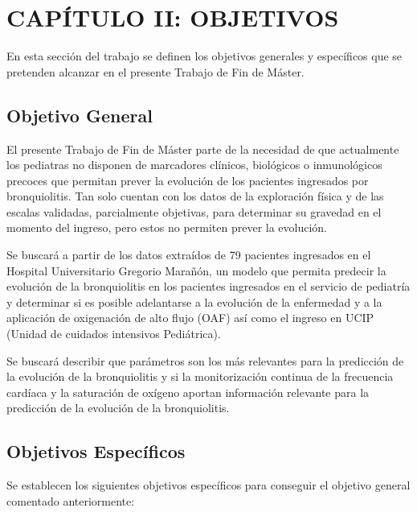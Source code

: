 \section{CAPÍTULO II: OBJETIVOS}\label{sec:objectives}

En esta sección del trabajo se definen los objetivos generales y específicos que se pretenden alcanzar en el presente Trabajo de Fin de Máster. 

\subsection{Objetivo General}

El presente Trabajo de Fin de Máster parte de la necesidad de que actualmente los pediatras no disponen de marcadores clínicos, biológicos o inmunológicos precoces que permitan prever la evolución de los pacientes ingresados por bronquiolitis. Tan solo cuentan con los datos de la exploración física y de las escalas validadas, parcialmente objetivas, para determinar su gravedad en el momento del ingreso, pero estos no permiten prever la evolución. 

Se buscará a partir de los datos extraídos de 79 pacientes ingresados en el Hospital Universitario Gregorio Marañón, un modelo que permita predecir la evolución de la bronquiolitis en los pacientes ingresados en el servicio de pediatría y determinar si es posible adelantarse a la evolución de la enfermedad y a la aplicación de oxigenación de alto flujo (OAF) así como el ingreso en UCIP (Unidad de cuidados intensivos Pediátrica).

Se buscará describir que parámetros son los más relevantes para la predicción de la evolución de la bronquiolitis y si la monitorización continua de la frecuencia cardíaca y la saturación de oxígeno aportan información relevante para la predicción de la evolución de la bronquiolitis.

\subsection{Objetivos Específicos}

Se establecen los siguientes objetivos específicos para conseguir el objetivo general comentado anteriormente:

